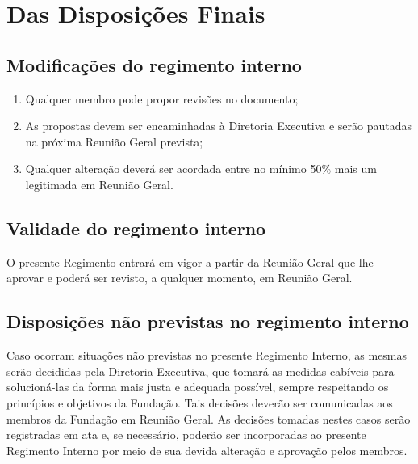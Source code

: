 \chapter{Das Disposições Finais}
    \section{Modificações do regimento interno}
        \begin{enumerate}
            \item Qualquer membro pode propor revisões no documento;
            \item As propostas devem ser encaminhadas à Diretoria Executiva e serão pautadas na próxima Reunião Geral prevista;
            \item Qualquer alteração deverá ser acordada entre no mínimo 50$\%$ mais um legitimada em Reunião Geral.
        \end{enumerate}

        
    \section{Validade do regimento interno}
        O presente Regimento entrará em vigor a partir da Reunião Geral que lhe aprovar e poderá ser revisto, a qualquer momento, em Reunião Geral.
        
    \section{Disposições não previstas no regimento interno}
        Caso ocorram situações não previstas no presente Regimento Interno, as mesmas serão decididas pela Diretoria Executiva, que tomará as medidas cabíveis para solucioná-las da forma mais justa e adequada possível, sempre respeitando os princípios e objetivos da Fundação. Tais decisões deverão ser comunicadas aos membros da Fundação em Reunião Geral.
        As decisões tomadas nestes casos serão registradas em ata e, se necessário, poderão ser incorporadas ao presente Regimento Interno por meio de sua devida alteração e aprovação pelos membros.
